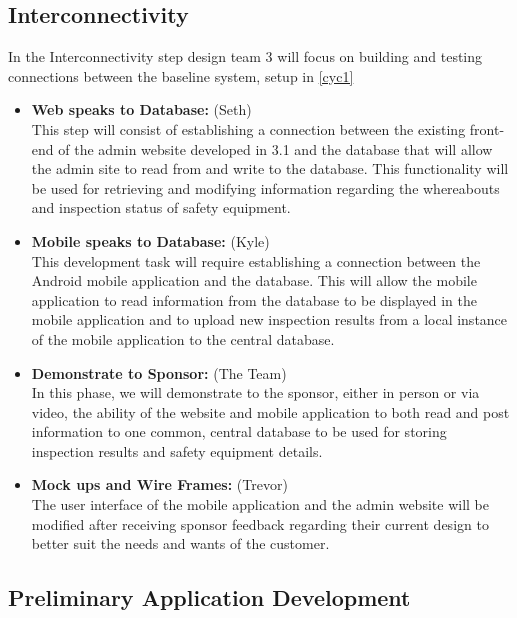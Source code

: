 \documentclass[Letter,11pt]{article}
\begin{document}
	\subsection{Interconnectivity}\label{connect}
		In the Interconnectivity step design team 3 will focus on building and testing connections between the baseline system, setup in \ref{cyc1}
		\begin{itemize}
			\item\textbf{Web speaks to Database:} (Seth)\\
			This step will consist of establishing a connection between the existing front-end of the admin website developed in 3.1 and the database that will allow the admin site to read from and write to the database.  This functionality will be used for retrieving and modifying information regarding the whereabouts and inspection status of safety equipment. 

			
			\item \textbf{Mobile speaks to Database:} (Kyle)\\
			This development task will require establishing a connection between the Android mobile application and the database.  This will allow the mobile application to read information from the database to be displayed in the mobile application and to upload new inspection results from a local instance of the mobile application to the central database.

			\item\textbf{Demonstrate to Sponsor:} (The Team)\\
			 In this phase, we will demonstrate to the sponsor, either in person or via video, the ability of the website and mobile application to both read and post information to one common, central database to be used for storing inspection results and safety equipment details.

			
			\item\textbf{Mock ups and Wire Frames:} (Trevor)\\
			The user interface of the mobile application and the admin website will be modified after receiving sponsor feedback regarding their current design to better suit the needs and wants of the customer.
			
			
		\end{itemize}
		
		\subsection{Preliminary Application Development}\label{dev1}
		
\end{document}
